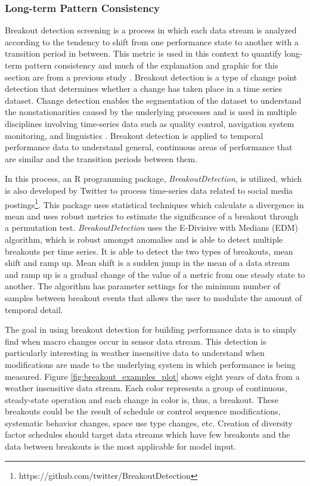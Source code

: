     \subsubsection{Long-term Pattern Consistency}
\label{sec:patternconsistency}

Breakout detection screening is a process in which each data stream is analyzed according to the tendency to shift from one performance state to another with a transition period in between. This metric is used in this context to quantify long-term pattern consistency and much of the explanation and graphic for this section are from a previous study \cite{miller_forensically_2015}. Breakout detection is a type of change point detection that determines whether a change has taken place in a time series dataset. Change detection enables the segmentation of the dataset to understand the nonstationarities caused by the underlying processes and is used in multiple disciplines involving time-series data such as quality control, navigation system monitoring, and linguistics \cite{basseville_detection_1993}. Breakout detection is applied to temporal performance data to understand general, continuous areas of performance that are similar and the transition periods between them.

In this process, an R programming package, \emph{BreakoutDetection}, is utilized, which is also developed by Twitter to process time-series data related to social media postings\footnote{https://github.com/twitter/BreakoutDetection}. This package uses statistical techniques which calculate a divergence in mean and uses robust metrics to estimate the significance of a breakout through a permutation test. \emph{BreakoutDetection} uses the E-Divisive with Medians (EDM) algorithm, which is robust amongst anomalies and is able to detect multiple breakouts per time series. It is able to detect the two types of breakouts, mean shift and ramp up. Mean shift is a sudden jump in the mean of a data stream and ramp up is a gradual change of the value of a metric from one steady state to another. The algorithm has parameter settings for the minimum number of samples between breakout events that allows the user to modulate the amount of temporal detail.

The goal in using breakout detection for building performance data is to simply find when macro changes occur in sensor data stream. This detection is particularly interesting in weather insensitive data to understand when modifications are made to the underlying system in which performance is being measured. Figure \ref{fig:breakout_examples_plot} shows eight years of data from a weather insensitive data stream. Each color represents a group of continuous, steady-state operation and each change in color is, thus, a breakout. These breakouts could be the result of schedule or control sequence modifications, systematic behavior changes, space use type changes, etc. Creation of diversity factor schedules should target data streams which have few breakouts and the data between breakouts is the most applicable for model input.